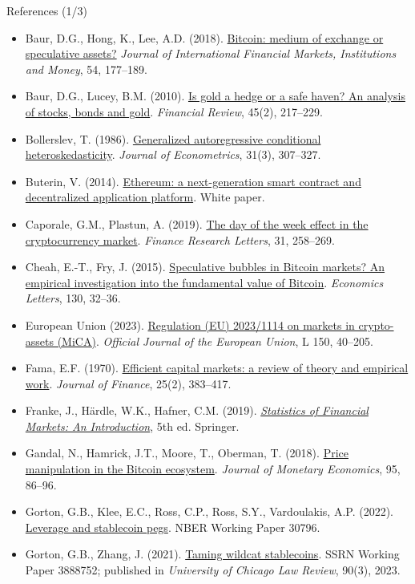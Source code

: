 \begin{frame}{References (1/3)}
\itemsize{\tiny}
\begin{itemize}
    \item Baur, D.G., Hong, K., Lee, A.D. (2018). \href{https://doi.org/10.1016/j.intfin.2017.12.004}{Bitcoin: medium of exchange or speculative assets?} \textit{Journal of International Financial Markets, Institutions and Money}, 54, 177--189.
    \item Baur, D.G., Lucey, B.M. (2010). \href{https://doi.org/10.1111/j.1540-6288.2010.00244.x}{Is gold a hedge or a safe haven? An analysis of stocks, bonds and gold}. \textit{Financial Review}, 45(2), 217--229.
    \item Bollerslev, T. (1986). \href{https://doi.org/10.1016/0304-4076(86)90063-1}{Generalized autoregressive conditional heteroskedasticity}. \textit{Journal of Econometrics}, 31(3), 307--327.
    \item Buterin, V. (2014). \href{https://ethereum.org/en/whitepaper/}{Ethereum: a next-generation smart contract and decentralized application platform}. White paper.
    \item Caporale, G.M., Plastun, A. (2019). \href{https://doi.org/10.1016/j.frl.2018.11.012}{The day of the week effect in the cryptocurrency market}. \textit{Finance Research Letters}, 31, 258--269.
    \item Cheah, E.-T., Fry, J. (2015). \href{https://doi.org/10.1016/j.econlet.2015.02.029}{Speculative bubbles in Bitcoin markets? An empirical investigation into the fundamental value of Bitcoin}. \textit{Economics Letters}, 130, 32--36.
    \item European Union (2023). \href{https://eur-lex.europa.eu/eli/reg/2023/1114/oj}{Regulation (EU) 2023/1114 on markets in crypto-assets (MiCA)}. \textit{Official Journal of the European Union}, L 150, 40--205.
    \item Fama, E.F. (1970). \href{https://doi.org/10.2307/2325486}{Efficient capital markets: a review of theory and empirical work}. \textit{Journal of Finance}, 25(2), 383--417.
    \item Franke, J., Härdle, W.K., Hafner, C.M. (2019). \href{https://doi.org/10.1007/978-3-030-13751-9}{\textit{Statistics of Financial Markets: An Introduction}}, 5th ed. Springer.
    \item Gandal, N., Hamrick, J.T., Moore, T., Oberman, T. (2018). \href{https://doi.org/10.1016/j.jmoneco.2017.12.004}{Price manipulation in the Bitcoin ecosystem}. \textit{Journal of Monetary Economics}, 95, 86--96.
    \item Gorton, G.B., Klee, E.C., Ross, C.P., Ross, S.Y., Vardoulakis, A.P. (2022). \href{https://doi.org/10.3386/w30796}{Leverage and stablecoin pegs}. NBER Working Paper 30796.
    \item Gorton, G.B., Zhang, J. (2021). \href{https://doi.org/10.2139/ssrn.3888752}{Taming wildcat stablecoins}. SSRN Working Paper 3888752; published in \textit{University of Chicago Law Review}, 90(3), 2023.
\end{itemize}
\end{frame}

